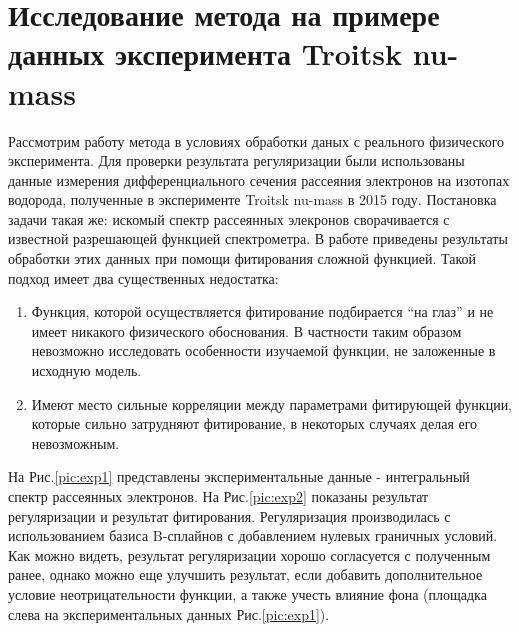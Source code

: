 \section{Исследование метода на примере данных эксперимента Troitsk nu-mass}
Рассмотрим работу метода в условиях обработки даных с реального физического эксперимента. Для проверки результата регуляризации были использованы данные измерения дифференциального сечения рассеяния электронов на изотопах водорода, полученные в эксперименте Troitsk nu-mass в 2015 году. Постановка задачи такая же: искомый спектр рассеянных элекронов сворачивается с известной разрешающей функцией спектрометра. В работе \cite{numass} приведены результаты обработки этих данных при помощи фитирования сложной функцией. Такой подход имеет два существенных недостатка:
\begin{enumerate}
    \item Функция, которой осуществляется фитирование подбирается ``на глаз'' и не имеет никакого физического обоснования. В частности таким образом невозможно исследовать особенности изучаемой функции, не заложенные в исходную модель.
    \item Имеют место сильные корреляции между параметрами фитирующей функции, которые сильно затрудняют фитирование, в некоторых случаях делая его невозможным.
\end{enumerate}
На Рис.\ref{pic:exp1} представлены экспериментальные данные - интегральный спектр рассеянных электронов. На Рис.\ref{pic:exp2} показаны результат регуляризации и результат фитирования. Регуляризация производилась с использованием базиса B-сплайнов с добавлением нулевых граничных условий. Как можно видеть, результат регуляризации хорошо согласуется с полученным ранее, однако можно еще улучшить результат, если добавить дополнительное условие неотрицательности функции, а также учесть влияние фона (площадка слева на экспериментальных данных Рис.\ref{pic:exp1}).